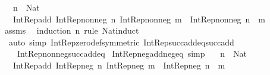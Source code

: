 \begin{isabellebody}
\ \ \ {\isachardoublequoteopen}n\ {\isacharcolon}{\kern0pt}\ Nat{\isachardoublequoteclose}\isanewline
\ \ \ {\isachardoublequoteopen}Int{\isacharunderscore}{\kern0pt}Rep{\isacharunderscore}{\kern0pt}add\ {\isacharparenleft}{\kern0pt}Int{\isacharunderscore}{\kern0pt}Rep{\isacharunderscore}{\kern0pt}nonneg\ n{\isacharparenright}{\kern0pt}\ {\isacharparenleft}{\kern0pt}Int{\isacharunderscore}{\kern0pt}Rep{\isacharunderscore}{\kern0pt}nonneg\ m{\isacharparenright}{\kern0pt}\ {\isacharequal}{\kern0pt}\ Int{\isacharunderscore}{\kern0pt}Rep{\isacharunderscore}{\kern0pt}nonneg\ {\isacharparenleft}{\kern0pt}n\ {\isacharplus}{\kern0pt}\ m{\isacharparenright}{\kern0pt}{\isachardoublequoteclose}\isanewline
%
\isadelimproof
\ \ %
\endisadelimproof
%
\isatagproof
{}\isamarkupfalse%
\ assms\ \isamarkupfalse%
\ {\isacharparenleft}{\kern0pt}induction\ n\ rule{\isacharcolon}{\kern0pt}\ Nat{\isacharunderscore}{\kern0pt}induct{\isacharparenright}{\kern0pt}\isanewline
\ \ {\isacharparenleft}{\kern0pt}auto\ simp{\isacharcolon}{\kern0pt}\ Int{\isacharunderscore}{\kern0pt}Rep{\isacharunderscore}{\kern0pt}zero{\isacharunderscore}{\kern0pt}def{\isacharbrackleft}{\kern0pt}symmetric{\isacharbrackright}{\kern0pt}\ Int{\isacharunderscore}{\kern0pt}Rep{\isacharunderscore}{\kern0pt}succ{\isacharunderscore}{\kern0pt}add{\isacharunderscore}{\kern0pt}eq{\isacharunderscore}{\kern0pt}succ{\isacharunderscore}{\kern0pt}add\isanewline
\ \ \ \ Int{\isacharunderscore}{\kern0pt}Rep{\isacharunderscore}{\kern0pt}nonneg{\isacharunderscore}{\kern0pt}succ{\isacharunderscore}{\kern0pt}add{\isacharunderscore}{\kern0pt}eq{\isacharparenright}{\kern0pt}%
\endisatagproof
{\isafoldproof}%
%
\isadelimproof
\isanewline
%
\endisadelimproof
\isanewline
{}\isamarkupfalse%
\ Int{\isacharunderscore}{\kern0pt}Rep{\isacharunderscore}{\kern0pt}neg{\isacharunderscore}{\kern0pt}add{\isacharunderscore}{\kern0pt}neg{\isacharunderscore}{\kern0pt}eq\ {\isacharbrackleft}{\kern0pt}simp{\isacharbrackright}{\kern0pt}{\isacharcolon}{\kern0pt}\isanewline
\ \ \ {\isachardoublequoteopen}n\ {\isacharcolon}{\kern0pt}\ Nat{\isachardoublequoteclose}\isanewline
\ \ \ {\isachardoublequoteopen}Int{\isacharunderscore}{\kern0pt}Rep{\isacharunderscore}{\kern0pt}add\ {\isacharparenleft}{\kern0pt}Int{\isacharunderscore}{\kern0pt}Rep{\isacharunderscore}{\kern0pt}neg\ n{\isacharparenright}{\kern0pt}\ {\isacharparenleft}{\kern0pt}Int{\isacharunderscore}{\kern0pt}Rep{\isacharunderscore}{\kern0pt}neg\ m{\isacharparenright}{\kern0pt}\ {\isacharequal}{\kern0pt}\ Int{\isacharunderscore}{\kern0pt}Rep{\isacharunderscore}{\kern0pt}neg\ {\isacharparenleft}{\kern0pt}n\ {\isacharplus}{\kern0pt}\ m{\isacharparenright}{\kern0pt}{\isachardoublequoteclose}\isanewline

\end{isabellebody}
